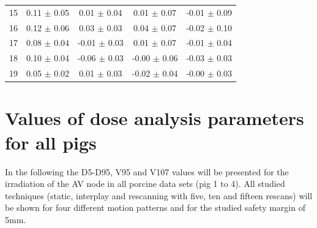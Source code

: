 \documentclass[type=dr, dr=rernat, accentcolor=tud7b,colorbacktitle, bigchapter, openright, twoside, 12pt ]{tudthesis}
\begin{document}
\begin{table}[H]
\begin{tabular}{|c|c|c|c|c|}
15&0.11 $\pm$ 0.05 &0.01 $\pm$ 0.04 &0.01 $\pm$ 0.07 &-0.01 $\pm$ 0.09 \\ 
16&0.12 $\pm$ 0.06 &0.03 $\pm$ 0.03 &0.04 $\pm$ 0.07 &-0.02 $\pm$ 0.10 \\
17&0.08 $\pm$ 0.04 &-0.01 $\pm$ 0.03 &0.01 $\pm$ 0.07 &-0.01 $\pm$ 0.04 \\
18&0.10 $\pm$ 0.04 &-0.06 $\pm$ 0.03 &-0.00 $\pm$ 0.06 &-0.03 $\pm$ 0.03 \\
19&0.05 $\pm$ 0.02 &0.01 $\pm$ 0.03 &-0.02 $\pm$ 0.04 &-0.00 $\pm$ 0.03 \\
    \hline\hline
  \end{tabular}
  \label{tab:motion:native:AV:Pig3}
\end{table}
 

\newpage
 
\section*{Values of dose analysis parameters for all pigs}
\label{app:pigs:mmt}

 In the following the D5-D95, V95 and V107 values will be presented for the irradiation of the AV node in all porcine data sets (pig 1 to 4). 
 All studied techniques (static, interplay and rescanning with five, ten and fifteen rescans) will be shown for 
 four different motion patterns and for the studied safety margin of 5mm. 
 
\end{document}
